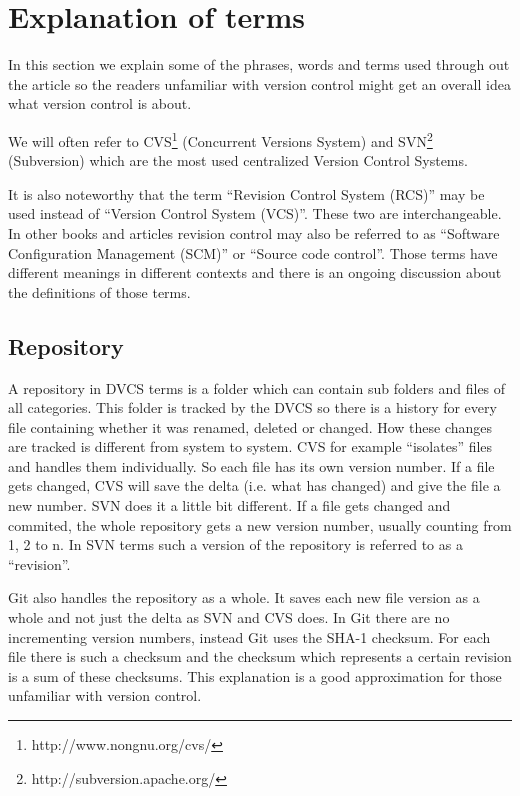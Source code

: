 \section{Explanation of terms}\label{explanationofterms}

In this section we explain some of the phrases, words and terms used through out the article so the 
readers unfamiliar with version control might get an overall idea what version control is about.

We will often refer to CVS\footnote{http://www.nongnu.org/cvs/} (Concurrent Versions System) and SVN\footnote{http://subversion.apache.org/} (Subversion) which are the most used centralized Version Control Systems.

It is also noteworthy that the term “Revision Control System (RCS)” may be used instead of “Version Control System (VCS)”. These two are interchangeable. In other books and articles revision control may also be referred to as “Software Configuration Management (SCM)” or “Source code control”. Those terms have different meanings in different contexts and there is an ongoing discussion about the definitions of those terms. \cite[chapter 1]{hgbook2009}

\subsection{Repository}

A repository in DVCS terms is a folder which can contain sub folders and files of all categories. 
This folder is tracked by the DVCS so there is a history for every file containing whether it was renamed, deleted or changed. 
How these changes are tracked is different from system to system. CVS for example “isolates” 
files and handles them individually. So each file has its own version number. If a file gets changed, CVS will 
save the delta (i.e. what has changed) and give the file a new number. SVN does it a little bit 
different. If a file gets changed and commited, the whole repository gets a new version number, usually counting from 1, 2 to n. 
In SVN terms such a version of the repository is referred to as a “revision”.

Git also handles the repository as a whole. It saves each new file version as a whole and not just the delta as SVN and CVS does. 
In Git there are no incrementing version numbers, instead Git uses the SHA-1 checksum. For each file there is such a 
checksum and the checksum which represents a certain revision is a sum of these checksums. \cite[chapter 2.3]{gitpro2009}
This explanation is a good approximation for those unfamiliar with version control.


